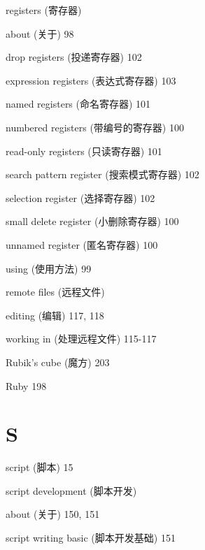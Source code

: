 \begin{multicols}{2}
\hangindent=3pc  registers (寄存器) \par
\hangindent=3pc \quad about (关于) 98 \par
\hangindent=3pc \quad drop registers (投递寄存器) 102 \par
\hangindent=3pc \quad expression registers (表达式寄存器) 103 \par
\hangindent=3pc \quad named registers (命名寄存器) 101 \par
\hangindent=3pc \quad numbered registers (带编号的寄存器) 100 \par
\hangindent=3pc \quad read-only registers (只读寄存器) 101 \par
\hangindent=3pc \quad search pattern register (搜索模式寄存器) 102 \par
\hangindent=3pc \quad selection register (选择寄存器) 102 \par
\hangindent=3pc \quad small delete register (小删除寄存器) 100 \par
\hangindent=3pc \quad unnamed register (匿名寄存器) 100 \par
\hangindent=3pc \quad using (使用方法) 99 \par

\hangindent=3pc  remote files (远程文件) \par
\hangindent=3pc \quad editing (编辑) 117, 118 \par
\hangindent=3pc \quad working in (处理远程文件) 115-117 \par

\hangindent=3pc  Rubik's cube (魔方) 203

\hangindent=3pc  Ruby 198

\hangindent=3pc  \section*{S}

\hangindent=3pc  script (脚本) 15

\hangindent=3pc  script development (脚本开发) \par
\hangindent=3pc \quad about (关于) 150, 151 \par
\hangindent=3pc \quad script writing basic (脚本开发基础) 151 \par


\end{multicols}
